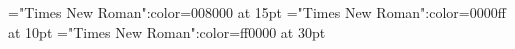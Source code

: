 \font\tctbta="Times New Roman":color=008000 at 15pt
\font\tbta="Times New Roman":color=0000ff at 10pt
\font\ta="Times New Roman":color=ff0000 at 30pt






\bye
